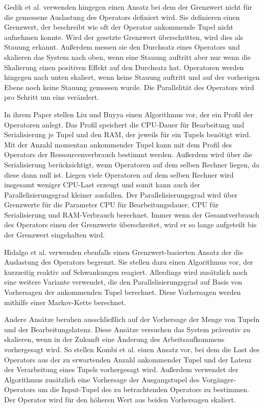 Gedik et al. \cite{gedik_elastic_2014} verwenden hingegen einen Ansatz bei dem der Grenzwert nicht für die gemessene Auslastung des Operators definiert wird.
Sie definieren einen Grenzwert, der beschreibt wie oft der Operator ankommende Tupel nicht aufnehmen konnte.
Wird der gesetzte Grenzwert überschritten, wird dies als Stauung erkannt.
Außerdem messen sie den Durchsatz eines Operators und skalieren das System nach oben, wenn eine Stauung auftritt aber nur wenn die Skalierung einen positiven Effekt auf den Durchsatz hat.
Operatoren werden hingegen nach unten skaliert, wenn keine Stauung auftritt und auf der vorherigen Ebene noch keine Stauung gemessen wurde.
Die Parallelität des Operators wird pro Schritt um eins verändert.

In ihrem Paper stellen Liu und Buyya \cite{liu_performance-oriented_2017} einen Algorithmus vor, der ein Profil der Operatoren anlegt. 
Das Profil speichert die CPU-Dauer für Bearbeitung und Serialisierung je Tupel und den RAM, der jeweils für ein Tupels benötigt wird.
Mit der Anzahl momentan ankommender Tupel kann mit dem Profil des Operators der Ressourcenverbrauch bestimmt werden.
Außerdem wird über die Serialisierung berücksichtigt, wenn Operatoren auf dem selben Rechner liegen, da diese dann null ist.
Liegen viele Operatoren auf dem selben Rechner wird insgesamt weniger CPU-Last erzeugt und somit kann auch der Parallelisierungsgrad kleiner ausfallen.
Der Parallelisierungsgrad wird über Grenzwerte für die Parameter CPU für Bearbeitungsdauer, CPU für Serialisierung und RAM-Verbrauch berechnet.
Immer wenn der Gesamtverbrauch des Operators einen der Grenzwerte überschreitet, wird er so lange aufgeteilt bis der Grenzwert eingehalten wird.

Hidalgo et al. verwenden ebenfalls einen Grenzwert-basierten Ansatz der die Auslastung des Operators begrenzt.
Sie stellen dazu einen Algorithmus vor, der kurzzeitig reaktiv auf Schwankungen reagiert.
Allerdings wird zusätzlich noch eine weitere Variante verwendet, die den Parallelisierungsgrad auf Basis von Vorhersagen der ankommenden Tupel berechnet.
Diese Vorhersagen werden mithilfe einer Markov-Kette berechnet.

Andere Ansätze beruhen ausschließlich auf der Vorhersage der Menge von Tupeln und der Bearbeitungslatenz.
Diese Ansätze versuchen das System präventiv zu skalieren, wenn in der Zukunft eine Änderung des Arbeitsaufkommens vorhergesagt wird.
So stellen Kombi et al. \cite{kombi_preventive_2017} einen Ansatz vor, bei dem die Last des Operators aus der zu erwartenden Anzahl ankommender Tupel und der Latenz der Verarbeitung eines Tupels vorhergesagt wird.
Außerdem verwendet der Algorithmus zusätzlich eine Vorhersage der Ausgangstupel des Vorgänger-Operators um die Input-Tupel des zu betrachtenden Operators zu bestimmen.
Der Operator wird für den höheren Wert aus beiden Vorhersagen skaliert.


